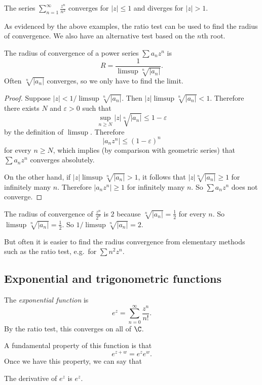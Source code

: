 \documentclass[a4paper]{article}
\begin{document}
\begin{eg}
  The series $\displaystyle \sum_{n = 1}^\infty \frac{z^{n}}{n^2}$ converges for $|z| \leq 1$ and diverges for $|z| > 1$.
\end{eg}

As evidenced by the above examples, the ratio test can be used to find the radius of convergence. We also have an alternative test based on the $n$th root.

\begin{lemma}
  The radius of convergence of a power series $\sum a_nz^n$ is
  \[
    R = \frac{1}{\limsup \sqrt[n]{|a_n|}}.
  \]
  Often $\sqrt[n]{|a_n|}$ converges, so we only have to find the limit.
\end{lemma}

\begin{proof}
  Suppose $|z| < 1/\limsup \sqrt[n]{|a_n|}$. Then $|z| \limsup \sqrt[n]{|a_n|} < 1$. Therefore there exists $N$ and $\varepsilon > 0$ such that
  \[
    \sup_{n \geq N}|z|\sqrt[n]{|a_n|} \leq 1 - \varepsilon
  \]
  by the definition of $\limsup$. Therefore
  \[
    |a_n z^n| \leq (1 - \varepsilon)^n
  \]
  for every $n \geq N$, which implies (by comparison with geometric series) that $\sum a_n z^n$ converges absolutely.

  On the other hand, if $|z|\limsup\sqrt[n]{|a_n|} > 1$, it follows that $|z|\sqrt[n]{|a_n|} \geq 1$ for infinitely many $n$. Therefore $|a_nz^n| \geq 1$ for infinitely many $n$. So $\sum a_nz^n$ does not converge.
\end{proof}

\begin{eg}
  The radius of convergence of $\displaystyle \frac{z^n}{2^n}$ is $2$ because $\sqrt[n]{|a_n|} = \frac{1}{2}$ for every $n$. So $\limsup \sqrt[n]{|a_n|} = \frac{1}{2}$. So $1/\limsup \sqrt[n]{|a_n|} = 2$.
\end{eg}

But often it is easier to find the radius convergence from elementary methods such as the ratio test, e.g.\ for $\sum n^2 z^n$.

\subsection{Exponential and trigonometric functions}
\begin{defi}
  The \emph{exponential function} is
  \[
    e^z = \sum_{n = 0}^\infty \frac{z^n}{n!}.
  \]
  By the ratio test, this converges on all of $\C$.
\end{defi}
A fundamental property of this function is that
\[
  e^{z + w} = e^ze^w.
\]
Once we have this property, we can say that
\begin{prop}
  The derivative of $e^z$ is $e^z$.
\end{prop}
\end{document}
